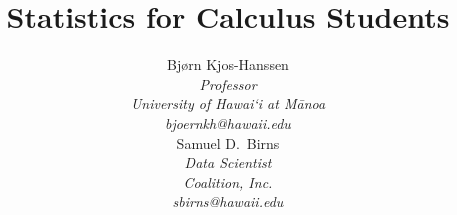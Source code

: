 
\title{\huge Statistics for Calculus Students\vspace{1.5mm} %
}
\author{Bj\o rn Kjos-Hanssen \\
\small\emph{Professor} \\
\small\emph{University of Hawai\textquoteleft i at M\=anoa} \\
\vspace{6mm}%
\small\emph{bjoernkh@hawaii.edu} \\
Samuel D.~Birns \\
\small\emph{Data Scientist} \\
\small\emph{Coalition, Inc.} \\
\vspace{6mm}%
\small\emph{sbirns@hawaii.edu}}
